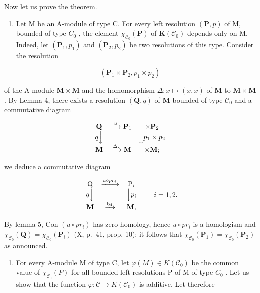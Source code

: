 Now let us prove the theorem.

\begin{enumerate}
\def\labelenumi{\alph{enumi})}
\tightlist
\item
  Let M be an A-module of type C. For every left resolution \((\mathbf{P}, p)\) of M, bounded of type \(C_{0}\) , the element \(\chi_{\mathcal{C}_{0}}(\mathbf{P})\) of \(\mathbf{K}(\mathcal{C}_{0})\) depends only on M. Indeed, let \((\mathbf{P}_{1}, p_{1})\) and \((\mathbf{P}_{2}, p_{2})\) be two resolutions of this type. Consider the resolution
\end{enumerate}

\[
(\mathbf {P} _ {1} \times \mathbf {P} _ {2}, p _ {1} \times p _ {2})
\]

of the A-module \(\mathbf{M} \times \mathbf{M}\) and the homomorphism \(\Delta : x \mapsto (x, x)\) of \(\mathbf{M}\) to \(\mathbf{M} \times \mathbf{M}\) . By Lemma 4, there exists a resolution \((\mathbf{Q}, q)\) of \(\mathbf{M}\) bounded of type \(\mathcal{C}_0\) and a commutative diagram

\[
\begin{array}{c c c} \mathbf {Q} & \stackrel {{u}} {{\longrightarrow}} \mathbf {P} _ {1} & \times \mathbf {P} _ {2} \\ q \Big \downarrow & & \Big \downarrow p _ {1} \times p _ {2} \\ \mathbf {M} & \stackrel {{\Delta .}} {{\longrightarrow}} \mathbf {M} & \times \mathbf {M}; \end{array}
\]

we deduce a commutative diagram

\[
\begin{array}{c c c} \mathrm{Q} & \xrightarrow {u \circ p r _ {i}} & \mathrm{P} _ {i} \\ q \Big \downarrow & & \Big \downarrow p _ {i} \\ \mathbf {M} & \xrightarrow {\mathrm{l} _ {\mathrm{M}}} & \mathbf {M}, \end{array} \qquad i = 1, 2.
\]

By lemma 5, Con \((u \circ pr_i)\) has zero homology, hence \(u \circ pr_i\) is a homologism and \(\chi_{\mathcal{C}_0}(\mathbf{Q}) = \chi_{\mathcal{C}_0}(\mathbf{P}_i)\) (X, p.~41, prop. 10); it follows that \(\chi_{\mathcal{C}_0}(\mathbf{P}_1) = \chi_{\mathcal{C}_0}(\mathbf{P}_2)\) as announced.

\begin{enumerate}
\def\labelenumi{\alph{enumi})}
\setcounter{enumi}{1}
\tightlist
\item
  For every A-module M of type C, let \(\varphi(M) \in K(\mathcal{C}_{0})\) be the common value of \(\chi_{\mathcal{C}_{0}}(P)\) for all bounded left resolutions P of M of type \(C_{0}\) . Let us show that the function \(\varphi : \mathcal{C} \to K(\mathcal{C}_{0})\) is additive. Let therefore
\end{enumerate}


